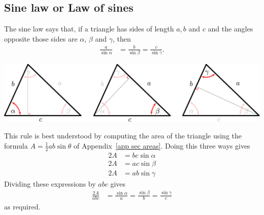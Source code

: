 \subsection{Sine law or Law of sines}
The sine law says that, if a triangle has sides of length $a, b$ and $c$ and
the angles opposite those sides are $\alpha$, $\beta$ and $\gamma$, then
\begin{align*}
  \frac{a}{\sin \alpha} &= \frac{b}{\sin \beta} = \frac{c}{\sin \gamma}.
\end{align*}
\begin{center}
 \includegraphics[height=3cm]{sines}
\end{center}
This rule is best understood by computing the area of the triangle using the
formula $A = \frac{1}{2}ab\sin\theta$ of Appendix~\ref{app sec areas}. Doing
this three ways gives
\begin{align*}
  2A &= bc \sin \alpha \\
  2A &= ac \sin \beta \\
  2A &= ab \sin \gamma
\end{align*}
Dividing these expressions by $abc$ gives
\begin{align*}
  \frac{2A}{abc} &= \frac{\sin \alpha}{a} = \frac{\sin\beta}{b} = \frac{\sin \gamma}{c}
\end{align*}
as required.

